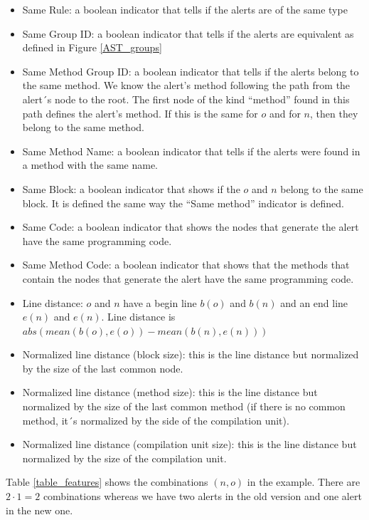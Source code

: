 \documentclass[
]{article}
\begin{document}
\begin{itemize}
\item
  Same Rule: a boolean indicator that tells if the alerts are of the
  same type
\item
  Same Group ID: a boolean indicator that tells if the alerts are
  equivalent as defined in Figure \ref{AST_groups}
\item
  Same Method Group ID: a boolean indicator that tells if the alerts
  belong to the same method. We know the alert's method following the
  path from the alert´s node to the root. The first node of the kind
  ``method'' found in this path defines the alert's method. If this is
  the same for \(o\) and for \(n\), then they belong to the same method.
\item
  Same Method Name: a boolean indicator that tells if the alerts were
  found in a method with the same name.
\item
  Same Block: a boolean indicator that shows if the \(o\) and \(n\)
  belong to the same block. It is defined the same way the ``Same
  method'' indicator is defined.
\item
  Same Code: a boolean indicator that shows the nodes that generate the
  alert have the same programming code.
\item
  Same Method Code: a boolean indicator that shows that the methods that
  contain the nodes that generate the alert have the same programming
  code.
\item
  Line distance: \(o\) and \(n\) have a begin line \(b(o)\) and \(b(n)\)
  and an end line \(e(n)\) and \(e(n)\). Line distance is
  \(abs(mean(b(o), e(o)) - mean(b(n), e(n)))\)
\item
  Normalized line distance (block size): this is the line distance but
  normalized by the size of the last common node.
\item
  Normalized line distance (method size): this is the line distance but
  normalized by the size of the last common method (if there is no
  common method, it´s normalized by the side of the compilation unit).
\item
  Normalized line distance (compilation unit size): this is the line
  distance but normalized by the size of the compilation unit.
\end{itemize}

Table \ref{table_features} shows the combinations \((n,o)\) in the
example. There are \(2 \cdot 1 = 2\) combinations whereas we have two
alerts in the old version and one alert in the new one.
\end{document}
